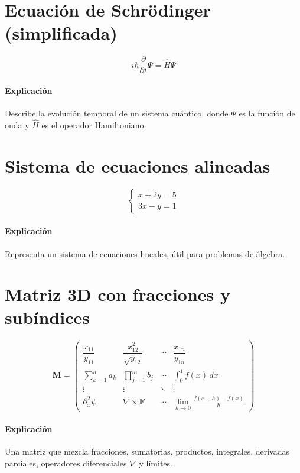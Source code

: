 \section{Ecuación de Schrödinger (simplificada)}

\[
i\hbar \frac{\partial}{\partial t} \Psi = \hat{H} \Psi
\]

\paragraph*{Explicación} Describe la evolución temporal de un sistema cuántico, donde $Ψ$ es la función de onda y $\hat{H}$ es el operador Hamiltoniano.

\section{Sistema de ecuaciones alineadas}
\[
\begin{cases}
	x + 2y = 5 \\
	3x - y = 1
\end{cases}
\]

\paragraph*{Explicación} Representa un sistema de ecuaciones lineales, útil para problemas de álgebra.

\section{Matriz 3D con fracciones y subíndices}

\[
\mathbf{M} = \begin{pmatrix}
	\dfrac{x_{11}}{y_{11}} & \dfrac{x_{12}^2}{\sqrt{y_{12}}} & \cdots & \dfrac{x_{1n}}{y_{1n}} \\
	\sum_{k=1}^n a_k & \prod_{j=1}^m b_j & \cdots & \int_0^1 f(x)\,dx \\
	\vdots & \vdots & \ddots & \vdots \\
	\partial_x^2 \psi & \nabla \times \mathbf{F} & \cdots & \lim_{h \to 0} \frac{f(x+h)-f(x)}{h}
\end{pmatrix}
\]

\paragraph*{Explicación} Una matriz que mezcla fracciones, sumatorias, productos, integrales, derivadas parciales, operadores diferenciales $\nabla$ y límites.


